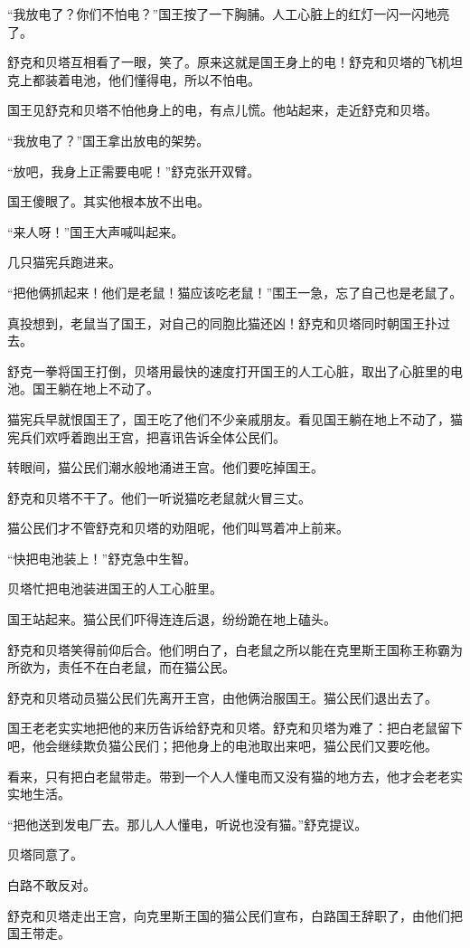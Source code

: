 \documentclass[a4paper,12pt,UTF8,twoside]{ctexbook}
\begin{document}
“我放电了？你们不怕电？”国王按了一下胸脯。人工心脏上的红灯一闪一闪地亮了。

舒克和贝塔互相看了一眼，笑了。原来这就是国王身上的电！舒克和贝塔的飞机坦克上都装着电池，他们懂得电，所以不怕电。

国王见舒克和贝塔不怕他身上的电，有点儿慌。他站起来，走近舒克和贝塔。

“我放电了？”国王拿出放电的架势。

“放吧，我身上正需要电呢！”舒克张开双臂。

国王傻眼了。其实他根本放不出电。

“来人呀！”国王大声喊叫起来。

几只猫宪兵跑进来。

“把他俩抓起来！他们是老鼠！猫应该吃老鼠！”围王一急，忘了自己也是老鼠了。

真投想到，老鼠当了国王，对自己的同胞比猫还凶！舒克和贝塔同时朝国王扑过去。

舒克一拳将国王打倒，贝塔用最快的速度打开国王的人工心脏，取出了心脏里的电池。国王躺在地上不动了。

猫宪兵早就恨国王了，国王吃了他们不少亲戚朋友。看见国王躺在地上不动了，猫宪兵们欢呼着跑出王宫，把喜讯告诉全体公民们。

转眼间，猫公民们潮水般地涌进王宫。他们要吃掉国王。

舒克和贝塔不干了。他们一听说猫吃老鼠就火冒三丈。

猫公民们才不管舒克和贝塔的劝阻呢，他们叫骂着冲上前来。

“快把电池装上！”舒克急中生智。

贝塔忙把电池装进国王的人工心脏里。

国王站起来。猫公民们吓得连连后退，纷纷跪在地上磕头。

舒克和贝塔笑得前仰后合。他们明白了，白老鼠之所以能在克里斯王国称王称霸为所欲为，责任不在白老鼠，而在猫公民。

舒克和贝塔动员猫公民们先离开王宫，由他俩治服国王。猫公民们退出去了。

国王老老实实地把他的来历告诉给舒克和贝塔。舒克和贝塔为难了：把白老鼠留下吧，他会继续欺负猫公民们；把他身上的电池取出来吧，猫公民们又要吃他。

看来，只有把白老鼠带走。带到一个人人懂电而又没有猫的地方去，他才会老老实实地生活。

“把他送到发电厂去。那儿人人懂电，听说也没有猫。”舒克提议。

贝塔同意了。

白路不敢反对。

舒克和贝塔走出王宫，向克里斯王国的猫公民们宣布，白路国王辞职了，由他们把国王带走。
\end{document}
